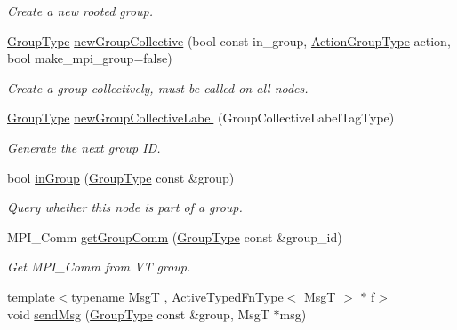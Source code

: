 \begin{DoxyCompactItemize}
\begin{DoxyCompactList}\small\item\em Create a new rooted group. \end{DoxyCompactList}\item 
\hyperlink{namespacevt_a27b5e4411c9b6140c49100e050e2f743}{Group\+Type} \hyperlink{structvt_1_1group_1_1_group_manager_a92b301d6cf77af7d57ed822c6f044d58}{new\+Group\+Collective} (bool const in\+\_\+group, \hyperlink{structvt_1_1group_1_1_group_manager_ae871c5871ad62b530220009c1ee4d4b9}{Action\+Group\+Type} action, bool make\+\_\+mpi\+\_\+group=false)
\begin{DoxyCompactList}\small\item\em Create a group collectively, must be called on all nodes. \end{DoxyCompactList}\item 
\hyperlink{namespacevt_a27b5e4411c9b6140c49100e050e2f743}{Group\+Type} \hyperlink{structvt_1_1group_1_1_group_manager_aabd66a33c6306ef472119cd5b2d96d3f}{new\+Group\+Collective\+Label} (Group\+Collective\+Label\+Tag\+Type)
\begin{DoxyCompactList}\small\item\em Generate the next group ID. \end{DoxyCompactList}\item 
bool \hyperlink{structvt_1_1group_1_1_group_manager_a9a0520b8e8e35f0f0127db0669c9b648}{in\+Group} (\hyperlink{namespacevt_a27b5e4411c9b6140c49100e050e2f743}{Group\+Type} const \&group)
\begin{DoxyCompactList}\small\item\em Query whether this node is part of a group. \end{DoxyCompactList}\item 
M\+P\+I\+\_\+\+Comm \hyperlink{structvt_1_1group_1_1_group_manager_aeb28b3e11f8901329a9a0c3bddd926f6}{get\+Group\+Comm} (\hyperlink{namespacevt_a27b5e4411c9b6140c49100e050e2f743}{Group\+Type} const \&group\+\_\+id)
\begin{DoxyCompactList}\small\item\em Get M\+P\+I\+\_\+\+Comm from VT group. \end{DoxyCompactList}\item 
{\footnotesize template$<$typename MsgT , Active\+Typed\+Fn\+Type$<$ Msg\+T $>$ $\ast$ f$>$ }\\void \hyperlink{structvt_1_1group_1_1_group_manager_ad7eca93f1423603999a05fd9c6df8725}{send\+Msg} (\hyperlink{namespacevt_a27b5e4411c9b6140c49100e050e2f743}{Group\+Type} const \&group, MsgT $\ast$msg)

\end{DoxyCompactItemize}
